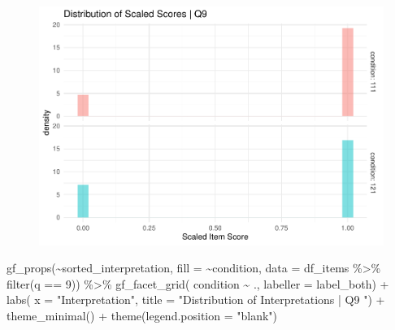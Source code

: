 \documentclass[
  letterpaper,
  DIV=11,
  numbers=noendperiod]{scrreprt}
\newenvironment{Shaded}{\begin{snugshade}}{\end{snugshade}}
\newcommand{\AttributeTok}[1]{\textcolor[rgb]{0.40,0.45,0.13}{#1}}
\newcommand{\DecValTok}[1]{\textcolor[rgb]{0.68,0.00,0.00}{#1}}
\newcommand{\FunctionTok}[1]{\textcolor[rgb]{0.28,0.35,0.67}{#1}}
\newcommand{\NormalTok}[1]{\textcolor[rgb]{0.00,0.23,0.31}{#1}}
\newcommand{\SpecialCharTok}[1]{\textcolor[rgb]{0.37,0.37,0.37}{#1}}
\newcommand{\StringTok}[1]{\textcolor[rgb]{0.13,0.47,0.30}{#1}}
\begin{document}
\begin{figure}[H]

{\centering \includegraphics{analysis/SGC3A/2_sgc3A_scoring_files/figure-pdf/Q9-distribution-1.pdf}

}

\end{figure}

\begin{Shaded}
\begin{Highlighting}[]
\FunctionTok{gf\_props}\NormalTok{(}\SpecialCharTok{\textasciitilde{}}\NormalTok{sorted\_interpretation, }\AttributeTok{fill =} \SpecialCharTok{\textasciitilde{}}\NormalTok{condition, }\AttributeTok{data =}\NormalTok{ df\_items }\SpecialCharTok{\%\textgreater{}\%} \FunctionTok{filter}\NormalTok{(q }\SpecialCharTok{==} \DecValTok{9}\NormalTok{)) }\SpecialCharTok{\%\textgreater{}\%} 
  \FunctionTok{gf\_facet\_grid}\NormalTok{( condition }\SpecialCharTok{\textasciitilde{}}\NormalTok{ ., }\AttributeTok{labeller =}\NormalTok{ label\_both) }\SpecialCharTok{+} 
  \FunctionTok{labs}\NormalTok{( }\AttributeTok{x =} \StringTok{"Interpretation"}\NormalTok{, }\AttributeTok{title =} \StringTok{"Distribution of Interpretations | Q9 "}\NormalTok{) }\SpecialCharTok{+} 
  \FunctionTok{theme\_minimal}\NormalTok{() }\SpecialCharTok{+} \FunctionTok{theme}\NormalTok{(}\AttributeTok{legend.position =} \StringTok{"blank"}\NormalTok{)}
\end{Highlighting}
\end{Shaded}
\end{document}
